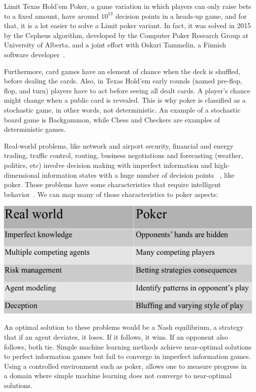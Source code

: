 Limit Texas Hold’em Poker, a game variation in which players can only raise bets to a fixed amount, have around $10^{13}$ decision points in a heads-up game, and for that, it is a lot easier to solve a Limit poker variant. In fact, it was solved in 2015 by the Cepheus algorithm, developed by the Computer Poker Research Group at University of Alberta, and a joint effort with Oskari Tammelin, a Finnish software developer~\cite{Tammelin2015}.

Furthermore, card games have an element of chance when the deck is shuffled, before dealing the cards. Also, in Texas Hold'em early rounds (named pre-flop, flop, and turn) players have to act before seeing all dealt cards. A player's chance might change when a public card is revealed. This is why poker is classified as a stochastic game, in other words, not deterministic. An example of a stochastic board game is Backgammon, while Chess and Checkers are examples of deterministic games.

Real-world problems, like network and airport security, financial and energy trading, traffic control, routing, business negotiations and forecasting (weather, politics, etc) involve decision making with imperfect information and high-dimensional information states with a huge number of decision points ~\cite{Silver2016}, like poker. Those problems have some characteristics that require intelligent behavior~\cite{Billings1998}. We can map many of those characteristics to poker aspects:

\vspace{0.5cm}
\includegraphics[scale=0.4]{real-world}
\vspace{0.5cm}

An optimal solution to these problems would be a Nash equilibrium, a strategy that if an agent deviates, it loses. If it follows, it wins. If an opponent also follows, both tie. Simple machine learning methods achieve near-optimal solutions to perfect information games but fail to converge in imperfect information games. Using a controlled environment such as poker, allows one to measure progress in a domain where simple machine learning does not converge to near-optimal solutions.

